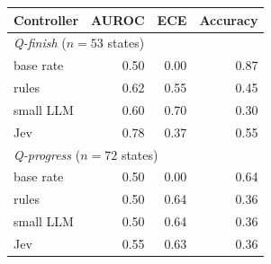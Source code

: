 \begin{tabular}{lrrr}
\toprule
Controller & AUROC & ECE & Accuracy \\
\midrule
\multicolumn{4}{l}{\emph{Q-finish} ($n=53$ states)} \\
\quad base rate & 0.50 & 0.00 & 0.87 \\
\quad rules & 0.62 & 0.55 & 0.45 \\
\quad small LLM & 0.60 & 0.70 & 0.30 \\
\quad Jev & 0.78 & 0.37 & 0.55 \\
\multicolumn{4}{l}{\emph{Q-progress} ($n=72$ states)} \\
\quad base rate & 0.50 & 0.00 & 0.64 \\
\quad rules & 0.50 & 0.64 & 0.36 \\
\quad small LLM & 0.50 & 0.64 & 0.36 \\
\quad Jev & 0.55 & 0.63 & 0.36 \\
\bottomrule
\end{tabular}
